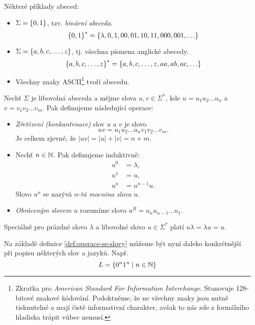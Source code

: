 \begin{example}
    Některé příklady abeced:
    \begin{itemize}
        \item $\Sigma=\left\{0,1\right\}$, tzv. \emph{binární abeceda}.
        \[\left\{0,1\right\}^*=\left\{\lambda,0,1,00,01,10,11,000,001,\ldots\right\}\]
        \item $\Sigma=\left\{a,b,c,\ldots,z\right\}$, tj. všechna písmena anglické abecedy.
        \[\left\{a,b,c,\ldots,z\right\}^*=\left\{a,b,c,\ldots,z,aa,ab,ac,\ldots\right\}\]
        \item Všechny znaky ASCII\footnote{Zkratka pro \emph{American Standard For Information Interchange}. Stanovuje 128-bitové znakové kódování. Podoktněme, že ne všechny znaky jsou nutně tisknutelné a mají čistě informativní charakter, avšak to nás zde z formálního hladiska trápit vůbec nemusí.} tvoří abecedu.
    \end{itemize}
\end{example}
\begin{definition}\label{def:operace-se-slovy}
    Nechť $\Sigma$ je libovolná abeceda a mějme slova $u,v\in\Sigma^*$, kde $u=u_1u_2\ldots u_n$ a $v=v_1v_2\ldots v_m$. Pak definujeme následující operace:
    \begin{itemize}
        \item \emph{Zřetězení (konkantenace)} slov $u$ a $v$ je slovo
        \[uv=u_1u_2\ldots u_nv_1v_2\ldots v_m.\]
        Je celkem zjevné, že $|uv|=|u|+|v|=n+m$.
        \item Nechť $n\in\mathbb{N}$. Pak definujeme induktivně:
        \begin{align*}
            u^0&=\lambda,\\
            u^1&=u,\\
            u^n&=u^{n-1}u.
        \end{align*}
        Slovo $u^n$ se nazývá \emph{$n$-tá mocnina slova} $u$.
        \item \emph{Obráceným slovem $u$} rozumíme slovo $u^R=u_nu_{n-1}\ldots u_1$.
    \end{itemize}
\end{definition}
\begin{remark}
    Speciálně pro prázdné slovo $\lambda$ a libovolné slovo $u\in\Sigma^*$ platí $u\lambda=\lambda u=u$.
\end{remark}
Na základě definice \ref{def:operace-se-slovy} můžeme být nyní daleko konkrétnější při popisu některých slov a jazyků. Např.
\[L=\left\{0^n1^n\mid n\in\mathbb{N}\right\}\]
